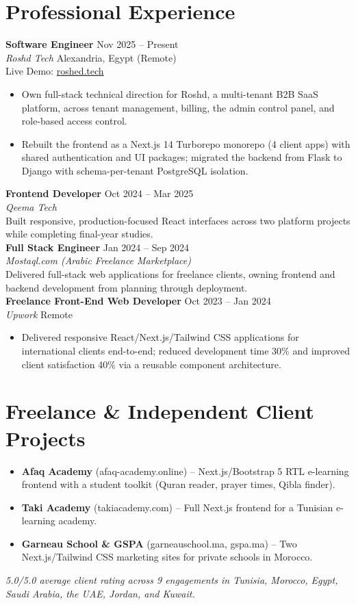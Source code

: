 \documentclass[10pt,letterpaper]{article}
\newcommand{\sectionrule}{\vspace{-1pt}{\color{hairline}\hrule height 0.6pt}\vspace{2pt}}
\newcommand{\entryHeading}[4]{%
  \textbf{#1} \hfill {\small\color{muted}#2}\\
  {\small\color{muted}\textit{#3}} \hfill {\small\color{muted}#4}\\[0pt]
}
\newcommand{\linkLine}[3]{{\footnotesize\color{muted}#1: }{\footnotesize\href{#2}{#3}}\\[0pt]}
\newcommand{\shortEntry}[4]{%
  \textbf{#1} \hfill {\small\color{muted}#2}\\
  {\small\color{muted}\textit{#3}}\\
  {\small #4}\\[1pt]
}
\newcommand{\sectionNote}[1]{{\footnotesize\color{muted}\itshape#1}}
\begin{document}
\section*{Professional Experience}
\sectionrule

\entryHeading{Software Engineer}{Nov 2025 -- Present}{Roshd Tech}{Alexandria, Egypt (Remote)}
\linkLine{Live Demo}{https://roshed.tech/}{roshed.tech}
{\small
\begin{itemize}
    \item Own full-stack technical direction for Roshd, a multi-tenant B2B SaaS platform, across tenant
    management, billing, the admin control panel, and role-based access control.
    \item Rebuilt the frontend as a Next.js 14 Turborepo monorepo (4 client apps) with shared authentication
    and UI packages; migrated the backend from Flask to Django with schema-per-tenant PostgreSQL isolation.
\end{itemize}
}

\shortEntry{Frontend Developer}{Oct 2024 -- Mar 2025}{Qeema Tech}{Built responsive, production-focused React interfaces across two platform projects while completing final-year studies.}

\shortEntry{Full Stack Engineer}{Jan 2024 -- Sep 2024}{Mostaql.com (Arabic Freelance Marketplace)}{Delivered full-stack web applications for freelance clients, owning frontend and backend development from planning through deployment.}

\entryHeading{Freelance Front-End Web Developer}{Oct 2023 -- Jan 2024}{Upwork}{Remote}
{\small
\begin{itemize}
    \item Delivered responsive React/Next.js/Tailwind CSS applications for international clients end-to-end;
    reduced development time 30\% and improved client satisfaction 40\% via a reusable component architecture.
\end{itemize}
}

\section*{Freelance \& Independent Client Projects}
\sectionrule
{\small
\begin{itemize}
    \item \textbf{Afaq Academy} (afaq-academy.online) -- Next.js/Bootstrap 5 RTL e-learning frontend with a
    student toolkit (Quran reader, prayer times, Qibla finder).
    \item \textbf{Taki Academy} (takiacademy.com) -- Full Next.js frontend for a Tunisian e-learning academy.
    \item \textbf{Garneau School \& GSPA} (garneauschool.ma, gspa.ma) -- Two Next.js/Tailwind CSS marketing
    sites for private schools in Morocco.
\end{itemize}
}
\sectionNote{5.0/5.0 average client rating across 9 engagements in Tunisia, Morocco, Egypt, Saudi Arabia, the
UAE, Jordan, and Kuwait.}
\end{document}
